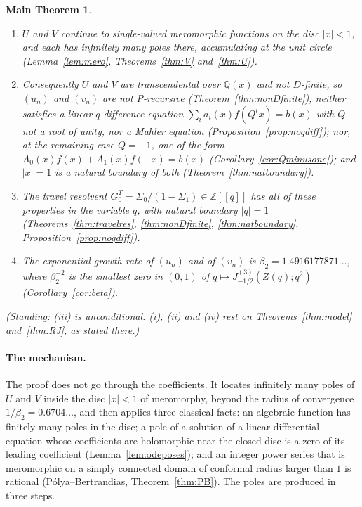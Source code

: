 \documentclass[11pt]{article}
\theoremstyle{plain}
\theoremstyle{definition}
\theoremstyle{remark}
\newcommand{\Z}{\mathbb{Z}}
\newcommand{\Q}{\mathbb{Q}}
\theoremstyle{plain}\newtheorem*{maintheorem}{Main Theorem}
\begin{document}
\begin{maintheorem}
\begin{enumerate}[label=\textup{(\roman*)},leftmargin=2.2em,itemsep=0.1em,topsep=0.2em]
\item $U$ and $V$ continue to single-valued meromorphic functions on the disc $|x|<1$, and each has
infinitely many poles there, accumulating at the unit circle
\textup{(}Lemma~\ref{lem:mero}, Theorems~\ref{thm:V} and~\ref{thm:U}\textup{)}.
\item Consequently $U$ and $V$ are transcendental over $\Q(x)$ and not $D$-finite, so $(u_n)$ and
$(v_n)$ are not P-recursive \textup{(}Theorem~\ref{thm:nonDfinite}\textup{)}; neither satisfies a
linear $q$-difference equation $\sum_ia_i(x)f(Q^ix)=b(x)$ with $Q$ not a root of unity, nor a Mahler
equation \textup{(}Proposition~\ref{prop:noqdiff}\textup{)}; nor, at the remaining case $Q=-1$, one
of the form $A_0(x)f(x)+A_1(x)f(-x)=b(x)$ \textup{(}Corollary~\ref{cor:Qminusone}\textup{)}; and
$|x|=1$ is a natural boundary of both \textup{(}Theorem~\ref{thm:natboundary}\textup{)}.
\item The travel resolvent $G^T_0=\Sigma_0/(1-\Sigma_1)\in\Z[[q]]$ has all of these properties in
the variable $q$, with natural boundary $|q|=1$ \textup{(}Theorems~\ref{thm:travelres},
\ref{thm:nonDfinite}, \ref{thm:natboundary}, Proposition~\ref{prop:noqdiff}\textup{)}.
\item The exponential growth rate of $(u_n)$ and of $(v_n)$ is $\beta_2=1.4916177871\ldots$, where
$\beta_2^{-2}$ is the smallest zero in $(0,1)$ of $q\mapsto J^{(3)}_{-1/2}(Z(q);q^2)$
\textup{(}Corollary~\ref{cor:beta}\textup{)}.
\end{enumerate}
\textup{(}Standing: \textup{(iii)} is unconditional. \textup{(i)}, \textup{(ii)} and \textup{(iv)}
rest on Theorems~\ref{thm:model} and~\ref{thm:RJ}, as stated there.\textup{)}
\end{maintheorem}

\paragraph{The mechanism.} The proof does not go through the coefficients. It locates infinitely
many poles of $U$ and $V$ inside the disc $|x|<1$ of meromorphy, beyond the radius of convergence
$1/\beta_2=0.6704\ldots$, and then applies three classical facts: an algebraic function has
finitely many poles in the disc; a pole of a solution of a linear differential equation whose
coefficients are holomorphic near the closed disc is a zero of its leading coefficient
(Lemma~\ref{lem:odeposes}); and an integer power series that is meromorphic on a simply connected
domain of conformal radius larger than $1$ is rational (P\'olya--Bertrandias,
Theorem~\ref{thm:PB}). The poles are produced in three steps.
\end{document}
